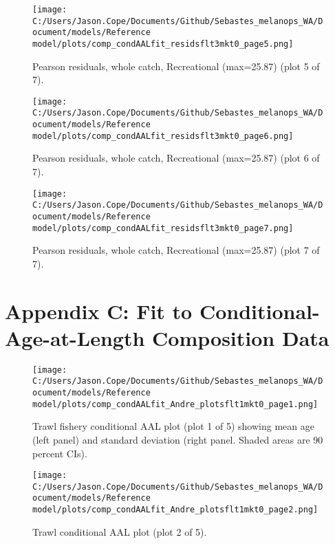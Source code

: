 \documentclass[11pt,
  english,
  letterpaper,
]{article}
\begin{document}
\begin{figure}
\centering
\texttt{[image: C:/Users/Jason.Cope/Documents/Github/Sebastes\_melanops\_WA/Document/models/Reference model/plots/comp\_condAALfit\_residsflt3mkt0\_page5.png]}
\caption{Pearson residuals, whole catch, Recreational (max=25.87) (plot 5 of 7).\label{fig:comp_condAALfit_residsflt3mkt0_page5}}
\end{figure}

\begin{figure}
\centering
\texttt{[image: C:/Users/Jason.Cope/Documents/Github/Sebastes\_melanops\_WA/Document/models/Reference model/plots/comp\_condAALfit\_residsflt3mkt0\_page6.png]}
\caption{Pearson residuals, whole catch, Recreational (max=25.87) (plot 6 of 7).\label{fig:comp_condAALfit_residsflt3mkt0_page6}}
\end{figure}

\begin{figure}
\centering
\texttt{[image: C:/Users/Jason.Cope/Documents/Github/Sebastes\_melanops\_WA/Document/models/Reference model/plots/comp\_condAALfit\_residsflt3mkt0\_page7.png]}
\caption{Pearson residuals, whole catch, Recreational (max=25.87) (plot 7 of 7).\label{fig:comp_condAALfit_residsflt3mkt0_page7}}
\end{figure}

\clearpage

\hypertarget{app-c}{%
\section{Appendix C: Fit to Conditional-Age-at-Length Composition Data}\label{app-c}}

\begin{figure}
\centering
\texttt{[image: C:/Users/Jason.Cope/Documents/Github/Sebastes\_melanops\_WA/Document/models/Reference model/plots/comp\_condAALfit\_Andre\_plotsflt1mkt0\_page1.png]}
\caption{Trawl fishery conditional AAL plot (plot 1 of 5) showing mean age (left panel) and standard deviation (right panel. Shaded areas are 90 percent CIs).\label{fig:comp_condAALfit_Andre_plotsflt1mkt0_page1}}
\end{figure}

\begin{figure}
\centering
\texttt{[image: C:/Users/Jason.Cope/Documents/Github/Sebastes\_melanops\_WA/Document/models/Reference model/plots/comp\_condAALfit\_Andre\_plotsflt1mkt0\_page2.png]}
\caption{Trawl conditional AAL plot (plot 2 of 5).\label{fig:comp_condAALfit_Andre_plotsflt1mkt0_page2}}
\end{figure}
\end{document}
